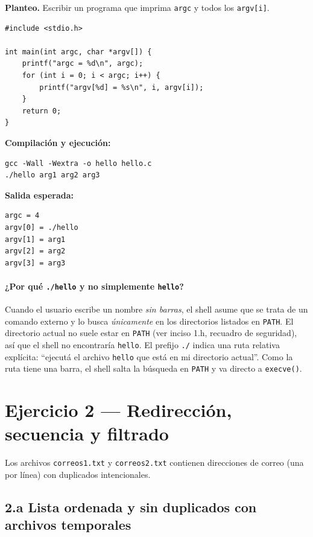 \documentclass[11pt,a4paper]{article}
\begin{document}
\textbf{Planteo.} Escribir un programa que imprima
\texttt{argc} y todos los \texttt{argv[i]}.

\begin{lstlisting}[style=cstyle]
#include <stdio.h>

int main(int argc, char *argv[]) {
    printf("argc = %d\n", argc);
    for (int i = 0; i < argc; i++) {
        printf("argv[%d] = %s\n", i, argv[i]);
    }
    return 0;
}
\end{lstlisting}

\textbf{Compilación y ejecución:}

\begin{lstlisting}
gcc -Wall -Wextra -o hello hello.c
./hello arg1 arg2 arg3
\end{lstlisting}

\textbf{Salida esperada:}

\begin{lstlisting}[style=outstyle]
argc = 4
argv[0] = ./hello
argv[1] = arg1
argv[2] = arg2
argv[3] = arg3
\end{lstlisting}

\paragraph{¿Por qué \texttt{./hello} y no simplemente \texttt{hello}?}
Cuando el usuario escribe un nombre \emph{sin barras}, el shell asume
que se trata de un comando externo y lo busca \emph{únicamente} en los
directorios listados en \texttt{PATH}. El directorio actual no suele
estar en \texttt{PATH} (ver inciso 1.h, recuadro de seguridad), así
que el shell no encontraría \texttt{hello}. El prefijo \texttt{./}
indica una ruta relativa explícita: ``ejecutá el archivo
\texttt{hello} que está en mi directorio actual''. Como la ruta tiene
una barra, el shell salta la búsqueda en \texttt{PATH} y va directo a
\texttt{execve()}.

\section{Ejercicio 2 --- Redirección, secuencia y filtrado}

Los archivos \texttt{correos1.txt} y \texttt{correos2.txt} contienen
direcciones de correo (una por línea) con duplicados intencionales.

\subsection*{2.a Lista ordenada y sin duplicados con archivos temporales}
\end{document}

